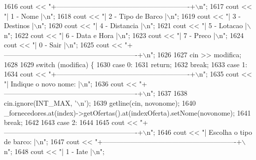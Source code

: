 \begin{DoxyCode}
1616     cout << \textcolor{stringliteral}{"+----------------------------------------------------------+\(\backslash\)n"};
1617     cout << \textcolor{stringliteral}{"| 1 - Nome                                                 |\(\backslash\)n"};
1618     cout << \textcolor{stringliteral}{"| 2 - Tipo de Barco                                        |\(\backslash\)n"};
1619     cout << \textcolor{stringliteral}{"| 3 - Destinos                                             |\(\backslash\)n"};
1620     cout << \textcolor{stringliteral}{"| 4 - Distancia                                            |\(\backslash\)n"};
1621     cout << \textcolor{stringliteral}{"| 5 - Lotacao                                              |\(\backslash\)n"};
1622     cout << \textcolor{stringliteral}{"| 6 - Data e Hora                                          |\(\backslash\)n"};
1623     cout << \textcolor{stringliteral}{"| 7 - Preco                                                |\(\backslash\)n"};
1624     cout << \textcolor{stringliteral}{"| 0 - Sair                                                 |\(\backslash\)n"};
1625     cout << \textcolor{stringliteral}{"+----------------------------------------------------------+\(\backslash\)n"};
1626 
1627     cin >> modifica;
1628 
1629     \textcolor{keywordflow}{switch} (modifica) \{
1630     \textcolor{keywordflow}{case} 0:
1631         \textcolor{keywordflow}{return};
1632         \textcolor{keywordflow}{break};
1633     \textcolor{keywordflow}{case} 1:
1634         cout << \textcolor{stringliteral}{"+----------------------------------------------------------+\(\backslash\)n"};
1635         cout << \textcolor{stringliteral}{"| Indique o novo nome:                                     |\(\backslash\)n"};
1636         cout << \textcolor{stringliteral}{"+----------------------------------------------------------+\(\backslash\)n"};
1637 
1638         cin.ignore(INT\_MAX, \textcolor{charliteral}{'\(\backslash\)n'});
1639         getline(cin, novonome);
1640         \_fornecedores.at(index)->getOfertas().at(indexOferta).setNome(novonome);
1641         \textcolor{keywordflow}{break};
1642 
1643     \textcolor{keywordflow}{case} 2:
1644 
1645         cout << \textcolor{stringliteral}{"+----------------------------------------------------------+\(\backslash\)n"};
1646         cout << \textcolor{stringliteral}{"| Escolha o tipo de barco:                                 |\(\backslash\)n"};
1647         cout << \textcolor{stringliteral}{"+----------------------------------------------------------+\(\backslash\)n"};
1648         cout << \textcolor{stringliteral}{"| 1 - Iate                                                 |\(\backslash\)n"};

\end{DoxyCode}
